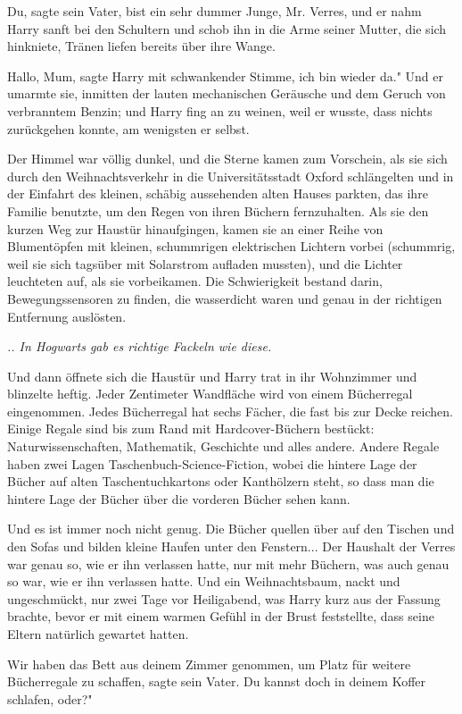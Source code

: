 \glqq Du\grqq{}, sagte sein Vater, \glqq bist ein sehr dummer Junge, Mr.
Verres\grqq{}, und er nahm Harry sanft bei den Schultern und schob ihn in die
Arme seiner Mutter, die sich hinkniete, Tränen liefen bereits über ihre Wange.

\glqq Hallo, Mum\grqq{}, sagte Harry mit schwankender Stimme, \glqq ich bin
wieder da." Und er umarmte sie, inmitten der lauten mechanischen Geräusche und
dem Geruch von verbranntem Benzin; und Harry fing an zu weinen, weil er wusste,
dass nichts zurückgehen konnte, am wenigsten er selbst.

Der Himmel war völlig dunkel, und die Sterne kamen zum Vorschein, als sie sich
durch den Weihnachtsverkehr in die Universitätsstadt Oxford schlängelten und in
der Einfahrt des kleinen, schäbig aussehenden alten Hauses parkten, das ihre
Familie benutzte, um den Regen von ihren Büchern fernzuhalten. Als sie den
kurzen Weg zur Haustür hinaufgingen, kamen sie an einer Reihe von Blumentöpfen
mit kleinen, schummrigen elektrischen Lichtern vorbei (schummrig, weil sie sich
tagsüber mit Solarstrom aufladen mussten), und die Lichter leuchteten auf, als
sie vorbeikamen. Die Schwierigkeit bestand darin, Bewegungssensoren zu finden,
die wasserdicht waren und genau in der richtigen Entfernung auslösten.

\emph{.. In Hogwarts gab es richtige Fackeln wie diese. }

Und dann öffnete sich die Haustür und Harry trat in ihr Wohnzimmer und blinzelte
heftig. Jeder Zentimeter Wandfläche wird von einem Bücherregal eingenommen.
Jedes Bücherregal hat sechs Fächer, die fast bis zur Decke reichen. Einige
Regale sind bis zum Rand mit Hardcover-Büchern bestückt: Naturwissenschaften,
Mathematik, Geschichte und alles andere. Andere Regale haben zwei Lagen
Taschenbuch-Science-Fiction, wobei die hintere Lage der Bücher auf alten
Taschentuchkartons oder Kanthölzern steht, so dass man die hintere Lage der
Bücher über die vorderen Bücher sehen kann.

Und es ist immer noch nicht genug. Die Bücher quellen über auf den Tischen und
den Sofas und bilden kleine Haufen unter den Fenstern... Der Haushalt der Verres
war genau so, wie er ihn verlassen hatte, nur mit mehr Büchern, was auch genau
so war, wie er ihn verlassen hatte. Und ein Weihnachtsbaum, nackt und
ungeschmückt, nur zwei Tage vor Heiligabend, was Harry kurz aus der Fassung
brachte, bevor er mit einem warmen Gefühl in der Brust feststellte, dass seine
Eltern natürlich gewartet hatten.

\glqq Wir haben das Bett aus deinem Zimmer genommen, um Platz für weitere
Bücherregale zu schaffen\grqq{}, sagte sein Vater. \glqq Du kannst doch in
deinem Koffer schlafen, oder?"

